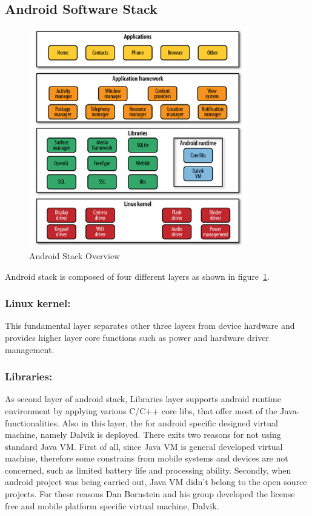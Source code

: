 \subsection{Android Software Stack}
\begin{figure}[!htbp]
	\centering
	\includegraphics[width=0.85\textwidth]{android-stack.jpg}
		\caption{Android Stack Overview \cite{learn_android}}
	\label{fig:android-stack}
\end{figure}
Android stack is composed of four different layers as shown in figure~\ref{fig:android-stack}.

\subsubsection{Linux kernel:}This fundamental layer separates other three layers  from  device hardware and provides higher layer core  functions such as  power and hardware driver management.
\subsubsection{Libraries:}As second layer of android stack,  Libraries layer supports android runtime environment by applying various C/C++ core libs, that offer most of the Java-functionalities.  Also in this layer, the for android specific designed virtual machine, namely Dalvik\cite{learn_android} is deployed. There exits two reasons for not using standard Java VM\cite{learn_android}. First of all, since Java VM is general developed virtual machine, therefore some constrains from mobile systems and devices are not concerned, such as limited battery life and processing ability. Secondly, when android project  was being carried out,  Java VM didn't  belong  to the open source projects. For these reasons Dan Bornstein and his group developed the license free and mobile platform specific virtual machine, Dalvik. 

